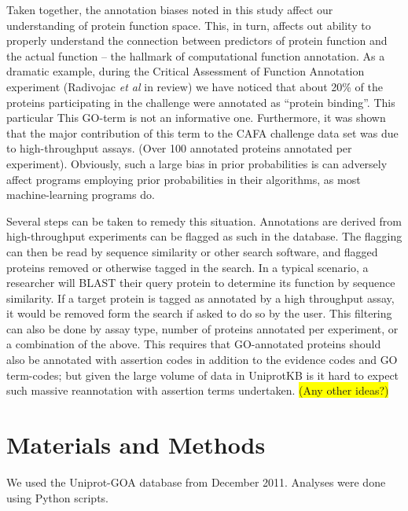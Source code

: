\documentclass[12pt]{article}
\newcommand{\hilite}[1]{\colorbox{yellow}{#1}}
\begin{document}
Taken together, the annotation biases noted in this study affect our understanding of protein
function space. This, in turn, affects out ability to properly understand the connection between
predictors of protein function and the actual function -- the hallmark of computational function
annotation. As a dramatic example, during the Critical Assessment of Function Annotation experiment
(Radivojac \textit{et al} in review) we have noticed that about 20\% of the proteins participating
in the challenge were annotated as ``protein binding''. This particular This GO-term is not an
informative one. Furthermore, it was shown that the major contribution of this term  to the CAFA
challenge data set was due to high-throughput assays. (Over 100 annotated proteins annotated per
experiment). Obviously, such a large bias in prior probabilities is can adversely affect programs
employing prior probabilities in their algorithms, as most machine-learning programs do. 

Several steps can be taken to remedy this situation. Annotations are derived from
high-throughput experiments can be flagged as such in the database. The flagging can then be
read by sequence similarity or other search software, and flagged proteins removed or
otherwise tagged in the search.  In a typical scenario, a researcher will BLAST their query
protein to determine its function by sequence similarity. If a target protein is tagged as
annotated by a high throughput assay, it would be removed form the search if asked to do so
by the user. This filtering can also be done by assay type, number of proteins annotated per
experiment, or a combination of the above. This requires that GO-annotated proteins should
also be annotated with assertion codes in addition to the evidence codes and GO term-codes;
but given the large volume of data in UniprotKB is it hard to expect such massive
reannotation with assertion terms undertaken. \hilite{(Any other ideas?)}



\section*{Materials and Methods}
We used the Uniprot-GOA database from December 2011. Analyses were done using Python scripts.

\end{document}
